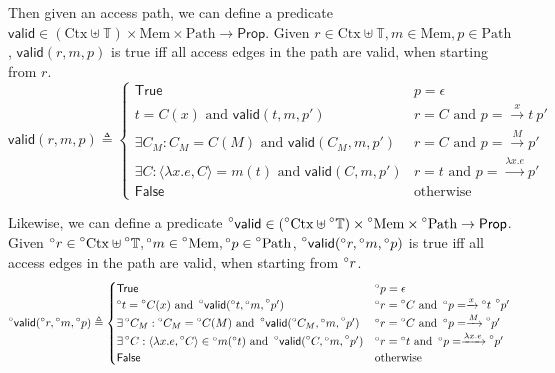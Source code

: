 \documentclass{article}
\theoremstyle{definition}
\newcommand*{\A}[1]{\prescript{\circ}{}{#1}}
\newcommand*{\Time}{\mathbb{T}}
\newcommand*{\Ctx}{\text{Ctx}}
\newcommand*{\Mem}{\text{Mem}}
\newcommand*{\mem}{m}
\newcommand*{\valid}{\mathsf{valid}}
\newcommand*{\Path}{\text{Path}}
\begin{document}
Then given an access path, we can define a predicate $\valid\in(\Ctx\uplus\Time)\times\Mem\times\Path\rightarrow\mathsf{Prop}$.
Given $r\in\Ctx\uplus\Time,\mem\in\Mem,p\in\Path$, $\valid(r,\mem,p)$ is true iff all access edges in the path are valid, when starting from $r$.
\[
  \valid(r,\mem,p)\triangleq
  \begin{cases}
    \mathsf{True}                                                       & p=\epsilon                             \\
    t=C(x)\text{ and }\valid(t,\mem,p')                                        & r=C\text{ and } p=\xrightarrow{x}t\:p'        \\
    \exists C_M:C_M=C(M)\text{ and }\valid(C_M,\mem,p')                       & r=C\text{ and } p=\xrightarrow{M}p'           \\
    \exists C:\langle\lambda x.e,C\rangle=\mem(t)\text{ and }\valid(C,\mem,p') & r=t\text{ and } p=\xrightarrow{\lambda x.e}p' \\
    \mathsf{False}                                                      & \text{otherwise}
  \end{cases}
\]

Likewise, we can define a predicate $\A\valid\in(\A\Ctx\uplus\A\Time)\times\A\Mem\times\A\Path\rightarrow\mathsf{Prop}$.
Given $\A{r}\in\A\Ctx\uplus\A\Time,\A\mem\in\A\Mem,\A{p}\in\A\Path$, $\A\valid(\A{r},\A\mem,\A{p})$ is true iff all access edges in the path are valid, when starting from $\A{r}$.
\[
  \A\valid(\A{r},\A\mem,\A{p})\triangleq
  \begin{cases}
    \mathsf{True}                                                                                   & \A{p}=\epsilon                                         \\
    \A{t}=\A{C}(x)\text{ and }\A\valid(\A{t},\A\mem,\A{p'})                                                & \A{r}=\A{C}\text{ and } \A{p}=\xrightarrow{x}\A{t}\:\A{p'}    \\
    \exists \A{C_M}:\A{C_M}=\A{C}(M)\text{ and }\A\valid(\A{C_M},\A\mem,\A{p'})                           & \A{r}=\A{C}\text{ and } \A{p}=\xrightarrow{M}\A{p'}           \\
    \exists \A{C}:\langle\lambda x.e,\A{C}\rangle\in\A\mem(\A{t})\text{ and }\A\valid(\A{C},\A\mem,\A{p'}) & \A{r}=\A{t}\text{ and } \A{p}=\xrightarrow{\lambda x.e}\A{p'} \\
    \mathsf{False}                                                                                  & \text{otherwise}
  \end{cases}
\]
\end{document}
